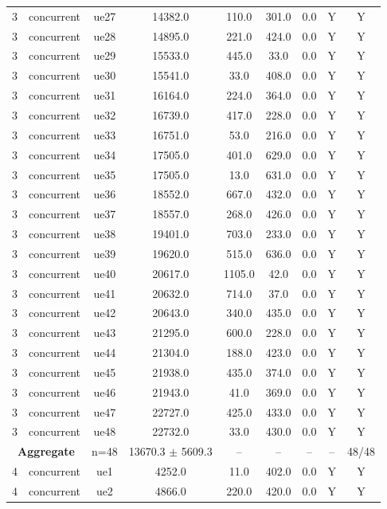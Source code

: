 \begin{table}[ht]
\begin{tabular}{|c|c|c|c|c|c|c|c|c|}
3 & concurrent & ue27 & 14382.0 & 110.0 & 301.0 & 0.0 & Y & Y \\
3 & concurrent & ue28 & 14895.0 & 221.0 & 424.0 & 0.0 & Y & Y \\
3 & concurrent & ue29 & 15533.0 & 445.0 & 33.0 & 0.0 & Y & Y \\
3 & concurrent & ue30 & 15541.0 & 33.0 & 408.0 & 0.0 & Y & Y \\
3 & concurrent & ue31 & 16164.0 & 224.0 & 364.0 & 0.0 & Y & Y \\
3 & concurrent & ue32 & 16739.0 & 417.0 & 228.0 & 0.0 & Y & Y \\
3 & concurrent & ue33 & 16751.0 & 53.0 & 216.0 & 0.0 & Y & Y \\
3 & concurrent & ue34 & 17505.0 & 401.0 & 629.0 & 0.0 & Y & Y \\
3 & concurrent & ue35 & 17505.0 & 13.0 & 631.0 & 0.0 & Y & Y \\
3 & concurrent & ue36 & 18552.0 & 667.0 & 432.0 & 0.0 & Y & Y \\
3 & concurrent & ue37 & 18557.0 & 268.0 & 426.0 & 0.0 & Y & Y \\
3 & concurrent & ue38 & 19401.0 & 703.0 & 233.0 & 0.0 & Y & Y \\
3 & concurrent & ue39 & 19620.0 & 515.0 & 636.0 & 0.0 & Y & Y \\
3 & concurrent & ue40 & 20617.0 & 1105.0 & 42.0 & 0.0 & Y & Y \\
3 & concurrent & ue41 & 20632.0 & 714.0 & 37.0 & 0.0 & Y & Y \\
3 & concurrent & ue42 & 20643.0 & 340.0 & 435.0 & 0.0 & Y & Y \\
3 & concurrent & ue43 & 21295.0 & 600.0 & 228.0 & 0.0 & Y & Y \\
3 & concurrent & ue44 & 21304.0 & 188.0 & 423.0 & 0.0 & Y & Y \\
3 & concurrent & ue45 & 21938.0 & 435.0 & 374.0 & 0.0 & Y & Y \\
3 & concurrent & ue46 & 21943.0 & 41.0 & 369.0 & 0.0 & Y & Y \\
3 & concurrent & ue47 & 22727.0 & 425.0 & 433.0 & 0.0 & Y & Y \\
3 & concurrent & ue48 & 22732.0 & 33.0 & 430.0 & 0.0 & Y & Y \\
\multicolumn{2}{|c|}{\textbf{Aggregate}} & n=48 & 13670.3 $\pm$ 5609.3 & -- & -- & -- & -- & 48/48 \\
\hline
4 & concurrent & ue1 & 4252.0 & 11.0 & 402.0 & 0.0 & Y & Y \\
4 & concurrent & ue2 & 4866.0 & 220.0 & 420.0 & 0.0 & Y & Y \\

\end{tabular}
\end{table}
